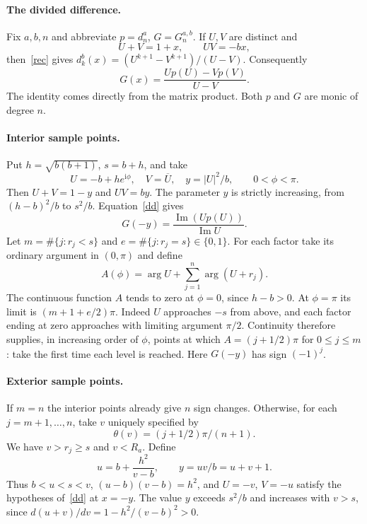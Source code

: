 \documentclass[11pt]{article}
\newcommand{\ii}{\mathrm{i}}
\begin{document}
\paragraph{The divided difference.}
Fix $a,b,n$ and abbreviate $p=d_n^a$, $G=G_n^{a,b}$. If $U,V$ are distinct and
\[
 U+V=1+x,\qquad UV=-bx,
\]
then~\eqref{rec} gives $d_k^b(x)=(U^{k+1}-V^{k+1})/(U-V)$. Consequently
\begin{equation}\label{dd}
 G(x)=\frac{U p(U)-V p(V)}{U-V}.
\end{equation}
The identity comes directly from the matrix product. Both $p$ and $G$ are monic of degree $n$.

\paragraph{Interior sample points.}
Put $h=\sqrt{b(b+1)}$, $s=b+h$, and take
\[
 U=-b+h e^{\ii\phi},\quad V=\overline U,
 \quad y=|U|^2/b,\qquad 0<\phi<\pi.
\]
Then $U+V=1-y$ and $UV=by$. The parameter $y$ is strictly increasing, from $(h-b)^2/b$ to $s^2/b$. Equation~\eqref{dd} gives
\[
 G(-y)=\frac{\operatorname{Im}(U p(U))}{\operatorname{Im} U}.
\]
Let $m=\#\{j:r_j<s\}$ and $e=\#\{j:r_j=s\}\in\{0,1\}$. For each factor take its ordinary argument in $(0,\pi)$ and define
\[
 A(\phi)=\arg U+\sum_{j=1}^n\arg(U+r_j).
\]
The continuous function $A$ tends to zero at $\phi=0$, since $h-b>0$. At $\phi=\pi$ its limit is $(m+1+e/2)\pi$. Indeed $U$ approaches $-s$ from above, and each factor ending at zero approaches with limiting argument $\pi/2$. Continuity therefore supplies, in increasing order of $\phi$, points at which $A=(j+1/2)\pi$ for $0\le j\le m$: take the first time each level is reached. Here $G(-y)$ has sign $(-1)^j$.

\paragraph{Exterior sample points.}
If $m=n$ the interior points already give $n$ sign changes. Otherwise, for each $j=m+1,\dots,n$, take $v$ uniquely specified by
\[
 \theta(v)=(j+1/2)\pi/(n+1).
\]
We have $v>r_j\ge s$ and $v<R_a$. Define
\[
 u=b+\frac{h^2}{v-b},\qquad y=uv/b=u+v+1.
\]
Thus $b<u<s<v$, $(u-b)(v-b)=h^2$, and $U=-v$, $V=-u$ satisfy the hypotheses of~\eqref{dd} at $x=-y$. The value $y$ exceeds $s^2/b$ and increases with $v>s$, since $d(u+v)/dv=1-h^2/(v-b)^2>0$.
\end{document}
